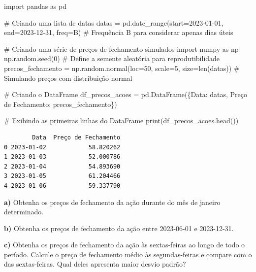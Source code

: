 \documentclass[
  portuguese,
  letterpaper,
  DIV=11,
  numbers=noendperiod]{scrreprt}
\newenvironment{Shaded}{\begin{snugshade}}{\end{snugshade}}
\newcommand{\BuiltInTok}[1]{\textcolor[rgb]{0.00,0.23,0.31}{#1}}
\newcommand{\CommentTok}[1]{\textcolor[rgb]{0.37,0.37,0.37}{#1}}
\newcommand{\DecValTok}[1]{\textcolor[rgb]{0.68,0.00,0.00}{#1}}
\newcommand{\ImportTok}[1]{\textcolor[rgb]{0.00,0.46,0.62}{#1}}
\newcommand{\NormalTok}[1]{\textcolor[rgb]{0.00,0.23,0.31}{#1}}
\newcommand{\OperatorTok}[1]{\textcolor[rgb]{0.37,0.37,0.37}{#1}}
\newcommand{\StringTok}[1]{\textcolor[rgb]{0.13,0.47,0.30}{#1}}
\theoremstyle{definition}
\theoremstyle{remark}
\begin{document}
\begin{Shaded}
\begin{Highlighting}[]
\ImportTok{import}\NormalTok{ pandas }\ImportTok{as}\NormalTok{ pd}

\CommentTok{\# Criando uma lista de datas}
\NormalTok{datas }\OperatorTok{=}\NormalTok{ pd.date\_range(start}\OperatorTok{=}\StringTok{\textquotesingle{}2023{-}01{-}01\textquotesingle{}}\NormalTok{, end}\OperatorTok{=}\StringTok{\textquotesingle{}2023{-}12{-}31\textquotesingle{}}\NormalTok{, freq}\OperatorTok{=}\StringTok{\textquotesingle{}B\textquotesingle{}}\NormalTok{)  }\CommentTok{\# Frequência \textquotesingle{}B\textquotesingle{} para considerar apenas dias úteis}

\CommentTok{\# Criando uma série de preços de fechamento simulados}
\ImportTok{import}\NormalTok{ numpy }\ImportTok{as}\NormalTok{ np}
\NormalTok{np.random.seed(}\DecValTok{0}\NormalTok{)  }\CommentTok{\# Define a semente aleatória para reprodutibilidade}
\NormalTok{precos\_fechamento }\OperatorTok{=}\NormalTok{ np.random.normal(loc}\OperatorTok{=}\DecValTok{50}\NormalTok{, scale}\OperatorTok{=}\DecValTok{5}\NormalTok{, size}\OperatorTok{=}\BuiltInTok{len}\NormalTok{(datas))  }\CommentTok{\# Simulando preços com distribuição normal}

\CommentTok{\# Criando o DataFrame}
\NormalTok{df\_precos\_acoes }\OperatorTok{=}\NormalTok{ pd.DataFrame(\{}\StringTok{\textquotesingle{}Data\textquotesingle{}}\NormalTok{: datas, }\StringTok{\textquotesingle{}Preço de Fechamento\textquotesingle{}}\NormalTok{: precos\_fechamento\})}

\CommentTok{\# Exibindo as primeiras linhas do DataFrame}
\BuiltInTok{print}\NormalTok{(df\_precos\_acoes.head())}
\end{Highlighting}
\end{Shaded}

\begin{verbatim}
        Data  Preço de Fechamento
0 2023-01-02            58.820262
1 2023-01-03            52.000786
2 2023-01-04            54.893690
3 2023-01-05            61.204466
4 2023-01-06            59.337790
\end{verbatim}

\textbf{a)} Obtenha os preços de fechamento da ação durante do mês de
janeiro determinado.

\textbf{b)} Obtenha os preços de fechamento da ação entre 2023-06-01 e
2023-12-31.

\textbf{c)} Obtenha os preços de fechamento da ação às sextas-feiras ao
longo de todo o período. Calcule o preço de fechamento médio às
segundas-feiras e compare com o das sextas-feiras. Qual deles apresenta
maior desvio padrão?
\end{document}
